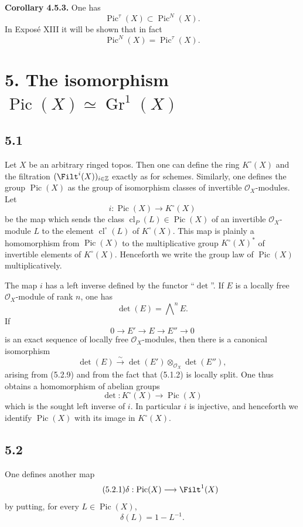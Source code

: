 \documentclass[11pt]{article}
\newcommand{\Gr}{\operatorname{Gr}}
\newcommand{\cl}{\operatorname{cl}}
\providecommand{\Pic}{\operatorname{Pic}}
\providecommand{\Gr}{\operatorname{Gr}}
\providecommand{\Gr}{\operatorname{G}}
\begin{document}
\textbf{Corollary 4.5.3.} One has
\[
 \Pic^\tau(X)\subset \Pic^N(X).
\]
In Exposé XIII it will be shown that in fact
\[
 \Pic^N(X)=\Pic^\tau(X).
\]

\section*{5. The isomorphism \(\Pic(X)\simeq\Gr^1(X)\)}

\subsection*{5.1}
Let \(X\) be an arbitrary ringed topos. Then one can define the ring \(K^\circ(X)\) and the filtration \((\Filt^i(X))_{i\in\mathbb Z}\) exactly as for schemes. Similarly, one defines the group \(\Pic(X)\) as the group of isomorphism classes of invertible \(\mathcal O_X\)-modules. Let
\begin{equation}\tag{5.1.1}
 i:\Pic(X)\longrightarrow K^\circ(X)
\end{equation}
be the map which sends the class \(\cl_P(L)\in\Pic(X)\) of an invertible \(\mathcal O_X\)-module \(L\) to the element \(\cl^\circ(L)\) of \(K^\circ(X)\). This map is plainly a homomorphism from \(\Pic(X)\) to the multiplicative group \(K^\circ(X)^*\) of invertible elements of \(K^\circ(X)\). Henceforth we write the group law of \(\Pic(X)\) multiplicatively.

The map \(i\) has a left inverse defined by the functor ``\(\det\)''. If \(E\) is a locally free \(\mathcal O_X\)-module of rank \(n\), one has
\[
 \det(E)=\bigwedge\nolimits^n E.
\]
If
\begin{equation}\tag{5.1.2}
 0\longrightarrow E'\longrightarrow E\longrightarrow E''\longrightarrow0
\end{equation}
is an exact sequence of locally free \(\mathcal O_X\)-modules, then there is a canonical isomorphism
\[
 \det(E)\xrightarrow{\sim}\det(E')\otimes_{\mathcal O_X}\det(E''),
\]
arising from (5.2.9) and from the fact that (5.1.2) is locally split. One thus obtains a homomorphism of abelian groups
\begin{equation}\tag{5.1.3}
 \det:K^\circ(X)\longrightarrow\Pic(X)
\end{equation}
which is the sought left inverse of \(i\). In particular \(i\) is injective, and henceforth we identify \(\Pic(X)\) with its image in \(K^\circ(X)\).

\subsection*{5.2}
One defines another map
\begin{equation}\tag{5.2.1}
 \delta:\Pic(X)\longrightarrow \Filt^1(X)
\end{equation}
by putting, for every \(L\in\Pic(X)\),
\[
 \delta(L)=1-L^{-1}.
\]
\end{document}

